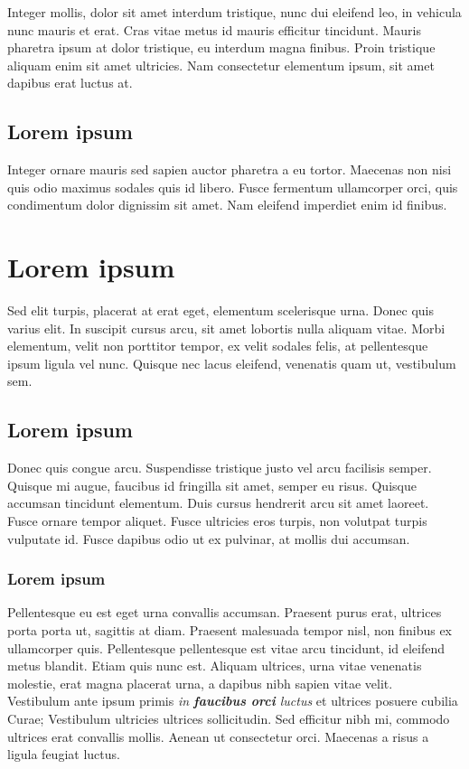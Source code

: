 \begin{pdf}
Integer mollis, dolor sit amet interdum tristique, nunc dui eleifend leo, in vehicula nunc mauris et erat. Cras vitae metus id mauris efficitur tincidunt. Mauris pharetra ipsum at dolor tristique, eu interdum magna finibus. Proin tristique aliquam enim sit amet ultricies. Nam consectetur elementum ipsum, sit amet dapibus erat luctus at.

\subsection{Lorem ipsum}

Integer ornare mauris sed sapien auctor pharetra a eu tortor. Maecenas non nisi quis odio maximus sodales quis id libero. Fusce fermentum ullamcorper orci, quis condimentum dolor dignissim sit amet. Nam eleifend imperdiet enim id finibus.

\section{Lorem ipsum}

Sed elit turpis, placerat at erat eget, elementum scelerisque urna. Donec quis varius elit. In suscipit cursus arcu, sit amet lobortis nulla aliquam vitae. Morbi elementum, velit non porttitor tempor, ex velit sodales felis, at pellentesque ipsum ligula vel nunc. Quisque nec lacus eleifend, venenatis quam ut, vestibulum sem.

\subsection{Lorem ipsum}

Donec quis congue arcu. Suspendisse tristique justo vel arcu facilisis semper. Quisque mi augue, faucibus id fringilla sit amet, semper eu risus. Quisque accumsan tincidunt elementum. Duis cursus hendrerit arcu sit amet laoreet. Fusce ornare tempor aliquet. Fusce ultricies eros turpis, non volutpat turpis vulputate id. Fusce dapibus odio ut ex pulvinar, at mollis dui accumsan. 

\subsubsection{Lorem ipsum}

Pellentesque eu est eget urna convallis accumsan. Praesent purus erat, ultrices porta porta ut, sagittis at diam. Praesent malesuada tempor nisl, non finibus ex ullamcorper quis. Pellentesque pellentesque est vitae arcu tincidunt, id eleifend metus blandit. Etiam quis nunc est. Aliquam ultrices, urna vitae venenatis molestie, erat magna placerat urna, a dapibus nibh sapien vitae velit.
\\
Vestibulum ante ipsum primis \textit{in \textbf{faucibus orci} luctus} et ultrices posuere cubilia Curae; Vestibulum ultricies ultrices sollicitudin. Sed efficitur nibh mi, commodo ultrices erat convallis mollis. Aenean ut consectetur orci. Maecenas a risus a ligula feugiat luctus. 


\end{pdf}

